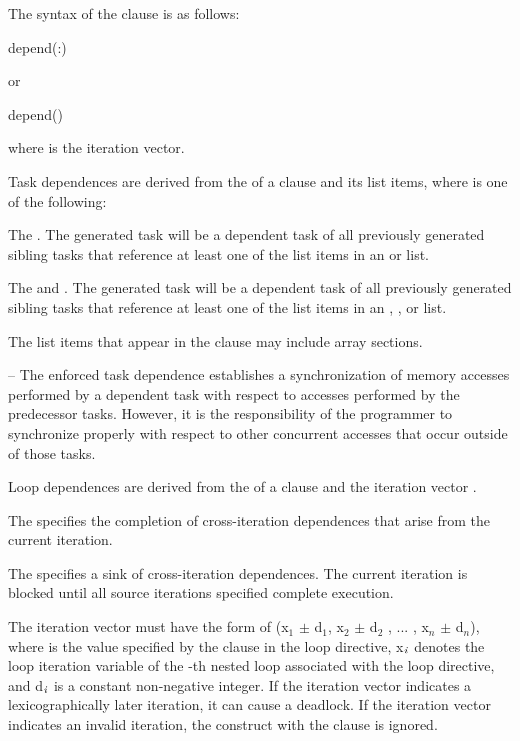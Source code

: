 \syntax
The syntax of the  clause is as follows:

\begin{boxedcode}
depend(:)
\end{boxedcode}

or

\begin{boxedcode}
depend(\plc{[: vec]})
\end{boxedcode}

where  is the iteration vector.

\descr
Task dependences are derived from the  of a  clause and its list 
items, where  is one of the following:

The  . The generated task will be a dependent task of all previously 
generated sibling tasks that reference at least one of the list items in an  or  
 list.

The  and  . The generated task will be a dependent task of 
all previously generated sibling tasks that reference at least one of the list items in an 
, , or   list.

The list items that appear in the  clause may include array sections.

\notestart
\noteheader – The enforced task dependence establishes a synchronization of memory 
accesses performed by a dependent task with respect to accesses performed by the 
predecessor tasks. However, it is the responsibility of the programmer to synchronize properly with respect to other concurrent accesses that occur outside of those tasks.
\noteend

Loop dependences are derived from the  of a  clause and the iteration vector .

The   specifies the completion of cross-iteration dependences that arise from the current iteration.

The   specifies a sink of cross-iteration dependences. The current iteration is blocked until all source iterations specified complete execution.

The iteration vector  must have the form of 
(x$_{1}$ $\pm $ d$_{1}$, x$_{2}$ $\pm $ d$_{2}$ , ... , x$_{n}$ $\pm $ d$_{n}$), 
where  is the value specified by the  clause in the loop directive, 
x$_{{\textrm{\textmd{\itshape{i}}}}}$ denotes the loop iteration variable of the -th nested loop associated with the loop directive, and 
d$_{{\textrm{\textmd{\itshape{i}}}}}$ is a constant non-negative integer. 
If the iteration vector  indicates a lexicographically later iteration, it can cause a deadlock. If the iteration vector  indicates an invalid iteration, the  construct with the  clause is ignored.


